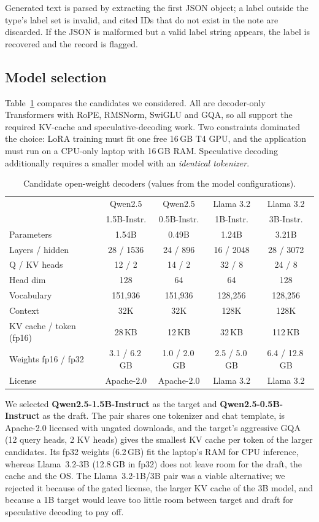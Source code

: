 Generated text is parsed by extracting the first JSON object; a label outside the type's label set is
invalid, and cited IDs that do not exist in the note are discarded. If the JSON is malformed but a
valid label string appears, the label is recovered and the record is flagged.

\subsection{Model selection}
\label{sec:model}
Table~\ref{tab:models} compares the candidates we considered. All are decoder-only Transformers with
RoPE, RMSNorm, SwiGLU and GQA, so all support the required KV-cache and speculative-decoding work. Two
constraints dominated the choice: LoRA training must fit one free 16\,GB T4 GPU, and the application
must run on a CPU-only laptop with 16\,GB RAM. Speculative decoding additionally requires a smaller
model with an \emph{identical tokenizer}.

\begin{table}[t]
\centering
\caption{Candidate open-weight decoders (values from the model configurations).}
\label{tab:models}
\setlength{\tabcolsep}{2.5pt}
\begin{tabular}{lcccc}
\toprule
 & Qwen2.5 & Qwen2.5 & Llama 3.2 & Llama 3.2 \\
 & 1.5B-Instr. & 0.5B-Instr. & 1B-Instr. & 3B-Instr. \\
\midrule
Parameters & 1.54B & 0.49B & 1.24B & 3.21B \\
Layers / hidden & 28 / 1536 & 24 / 896 & 16 / 2048 & 28 / 3072 \\
Q / KV heads & 12 / 2 & 14 / 2 & 32 / 8 & 24 / 8 \\
Head dim & 128 & 64 & 64 & 128 \\
Vocabulary & 151,936 & 151,936 & 128,256 & 128,256 \\
Context & 32K & 32K & 128K & 128K \\
KV cache / token (fp16) & 28\,KB & 12\,KB & 32\,KB & 112\,KB \\
Weights fp16 / fp32 & 3.1 / 6.2\,GB & 1.0 / 2.0\,GB & 2.5 / 5.0\,GB & 6.4 / 12.8\,GB \\
License & Apache-2.0 & Apache-2.0 & Llama 3.2 & Llama 3.2 \\
\bottomrule
\end{tabular}
\end{table}

We selected \textbf{Qwen2.5-1.5B-Instruct} as the target and \textbf{Qwen2.5-0.5B-Instruct} as the
draft. The pair shares one tokenizer and chat template, is Apache-2.0 licensed with ungated downloads,
and the target's aggressive GQA (12 query heads, 2 KV heads) gives the smallest KV cache per token of
the larger candidates. Its fp32 weights (6.2\,GB) fit the laptop's RAM for CPU inference, whereas
Llama~3.2-3B (12.8\,GB in fp32) does not leave room for the draft, the cache and the OS. The
Llama~3.2-1B/3B pair was a viable alternative; we rejected it because of the gated license, the
larger KV cache of the 3B model, and because a 1B target would leave too little room between target
and draft for speculative decoding to pay off.

